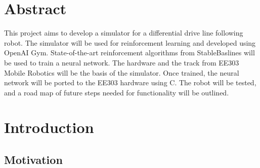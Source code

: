 \documentclass[a4paper,12pt]{article}
\begin{document}
\pagestyle{fancy}
\renewcommand{\chaptermark}[1]{\markboth{#1}{#1}}
\fancyhead[R]{}
\fancyhead[L]{\chaptername\ \thechapter\\ \leftmark}

\clearpage


\section{Abstract}

This project aims to develop a simulator for a differential drive line following robot. The simulator will be used for reinforcement learning and developed using OpenAI Gym. State-of-the-art reinforcement algorithms from StableBaslines will be used to train a neural network. The hardware and the track from EE303 Mobile Robotics will be the basis of the simulator. Once trained, the neural network will be ported to the EE303 hardware using C. The robot will be tested, and a road map of future steps needed for functionality will be outlined.
\pagebreak



\tableofcontents


\pagebreak
\listoffigures
\pagebreak
\listoftables
\pagebreak

\section{Introduction}
\subsection{Motivation}
\end{document}
